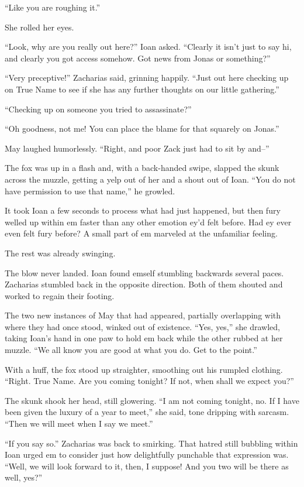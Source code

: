 ``Like you are roughing it.''

She rolled her eyes.

``Look, why are you really out here?'' Ioan asked. ``Clearly it isn't just to say hi, and clearly you got access somehow. Got news from Jonas or something?''

``Very preceptive!'' Zacharias said, grinning happily. ``Just out here checking up on True Name to see if she has any further thoughts on our little gathering.''

``Checking up on someone you tried to assassinate?''

``Oh goodness, not me! You can place the blame for that squarely on Jonas.''

May laughed humorlessly. ``Right, and poor Zack just had to sit by and--''

The fox was up in a flash and, with a back-handed swipe, slapped the skunk across the muzzle, getting a yelp out of her and a shout out of Ioan. ``You do not have permission to use that name,'' he growled.

It took Ioan a few seconds to process what had just happened, but then fury welled up within em faster than any other emotion ey'd felt before. Had ey ever even felt fury before? A small part of em marveled at the unfamiliar feeling.

The rest was already swinging.

The blow never landed. Ioan found emself stumbling backwards several paces. Zacharias stumbled back in the opposite direction. Both of them shouted and worked to regain their footing.

The two new instances of May that had appeared, partially overlapping with where they had once stood, winked out of existence. ``Yes, yes,'' she drawled, taking Ioan's hand in one paw to hold em back while the other rubbed at her muzzle. ``We all know you are good at what you do. Get to the point.''

With a huff, the fox stood up straighter, smoothing out his rumpled clothing. ``Right. True Name. Are you coming tonight? If not, when shall we expect you?''

The skunk shook her head, still glowering. ``I am not coming tonight, no. If I have been given the luxury of a year to meet,'' she said, tone dripping with sarcasm. ``Then we will meet when I say we meet.''

``If you say so.'' Zacharias was back to smirking. That hatred still bubbling within Ioan urged em to consider just how delightfully punchable that expression was. ``Well, we will look forward to it, then, I suppose! And you two will be there as well, yes?''

